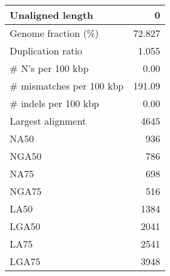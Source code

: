 \documentclass[12pt,a4paper]{article}
\begin{document}
\begin{table}[ht]
\begin{center}
\begin{tabular}{|l*{1}{|r}|}
Unaligned length & 0 \\ \hline
Genome fraction (\%) & 72.827 \\ \hline
Duplication ratio & 1.055 \\ \hline
\# N's per 100 kbp & 0.00 \\ \hline
\# mismatches per 100 kbp & 191.09 \\ \hline
\# indels per 100 kbp & 0.00 \\ \hline
Largest alignment & 4645 \\ \hline
NA50 & 936 \\ \hline
NGA50 & 786 \\ \hline
NA75 & 698 \\ \hline
NGA75 & 516 \\ \hline
LA50 & 1384 \\ \hline
LGA50 & 2041 \\ \hline
LA75 & 2541 \\ \hline
LGA75 & 3948 \\ \hline
\end{tabular}
\end{center}
\end{table}
\end{document}
